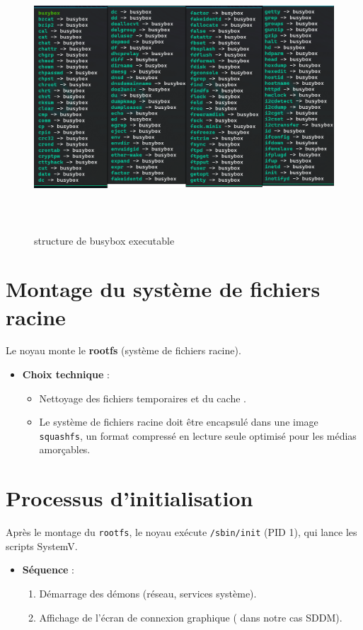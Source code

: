 \begin{figure}[H]
  \centering
  \includegraphics[width=1\textwidth, height=10cm]{images_pfe/busyboxbinary.png}
  \caption{structure de busybox executable}
  \label{fig:busybox}
\end{figure}
\clearpage
\section{Montage du système de fichiers racine}  
Le noyau monte le \textbf{rootfs} (système de fichiers racine).  
\begin{itemize}  
  \item \textbf{Choix technique} :  
    \begin{itemize}  
    \item Nettoyage des fichiers temporaires et du cache . 
      \item  Le système de fichiers racine doit être encapsulé dans une image \texttt{squashfs}, un format compressé en lecture seule optimisé pour les médias amorçables. 
       
        
    \end{itemize}  
\end{itemize}  

\section{Processus d’initialisation}  
Après le montage du \texttt{rootfs}, le noyau exécute \texttt{/sbin/init} (PID 1), qui lance les scripts SystemV.  
\begin{itemize}  
  \item \textbf{Séquence} :  
    \begin{enumerate}  
      \item Démarrage des démons (réseau, services système).  
      \item Affichage de l’écran de connexion graphique ( dans notre cas SDDM).  
    \end{enumerate}  
\end{itemize}  

